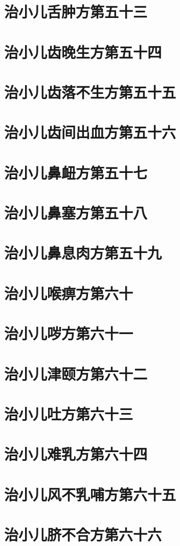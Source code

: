 \documentclass[a4paper,12pt,UTF8,twoside]{ctexbook}
\begin{document}
\chapter{治小儿舌肿方第五十三}
\chapter{治小儿齿晚生方第五十四}
\chapter{治小儿齿落不生方第五十五}
\chapter{治小儿齿间出血方第五十六}
\chapter{治小儿鼻衄方第五十七}
\chapter{治小儿鼻塞方第五十八}
\chapter{治小儿鼻息肉方第五十九}
\chapter{治小儿喉痹方第六十}
\chapter{治小儿哕方第六十一}
\chapter{治小儿津颐方第六十二}
\chapter{治小儿吐方第六十三}
\chapter{治小儿难乳方第六十四}
\chapter{治小儿风不乳哺方第六十五}
\chapter{治小儿脐不合方第六十六}
\end{document}
